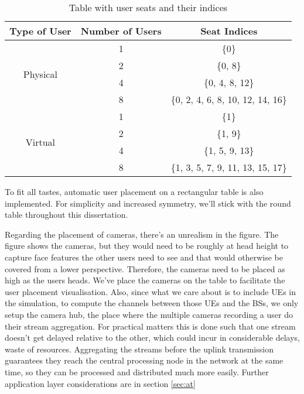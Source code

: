 \begin{table}[htp]
    \centering
    \caption{Table with user seats and their indices}
    \label{tab:tab_user_seats}
    \begin{tabular}{|c|c|c|}
        \hline
        Type of User              & Number of Users & Seat Indices                      \\ \hline
        \multirow{4}{*}{Physical} & 1               & \{0\}                             \\ \cline{2-3} 
                                  & 2               & \{0, 8\}                          \\ \cline{2-3} 
                                  & 4               & \{0, 4, 8, 12\}                   \\ \cline{2-3} 
                                  & 8               & \{0, 2, 4, 6, 8, 10, 12, 14, 16\} \\ \hline
        \multirow{4}{*}{Virtual}  & 1               & \{1\}                             \\ \cline{2-3} 
                                  & 2               & \{1, 9\}                          \\ \cline{2-3} 
                                  & 4               & \{1, 5, 9, 13\}                   \\ \cline{2-3} 
                                  & 8               & \{1, 3, 5, 7, 9, 11, 13, 15, 17\} \\ \hline
    \end{tabular}
\end{table}


To fit all tastes, automatic user placement on a rectangular table is also implemented. For simplicity and increased symmetry, we'll stick with the round table throughout this dissertation.

Regarding the placement of cameras, there's an unrealism in the figure. The figure shows the cameras, but they would need to be roughly at head height to capture face features the other users need to see and that would otherwise be covered from a lower perspective. Therefore, the cameras need to be placed as high as the users heads. We've place the cameras on the table to facilitate the user placement visualisation. Also, since what we care about is to include \acsp{UE} in the simulation, to compute the channels between those \acsp{UE} and the \acsp{BS}, we only setup the camera hub, the place where the multiple cameras recording a user do their stream aggregation. For practical matters this is done such that one stream doesn't get delayed relative to the other, which could incur in considerable delays, waste of resources. Aggregating the streams before the uplink transmission guarantees they reach the central processing node in the network at the same time, so they can be processed and distributed much more easily. Further application layer considerations are in section \ref{sec:at}

